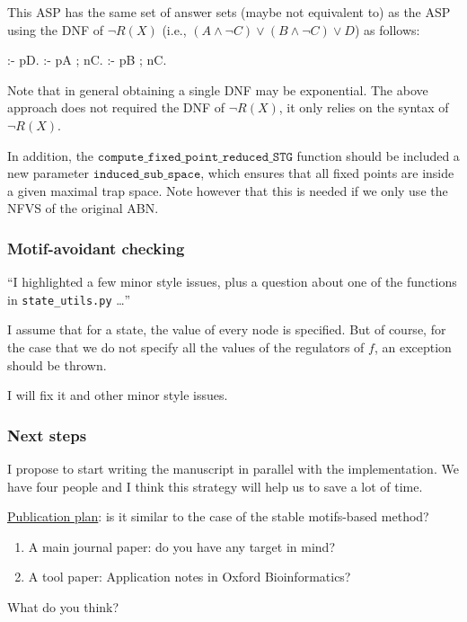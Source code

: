 \documentclass{beamer}              %
\begin{document}
\begin{frame}
This ASP has the same set of answer sets (maybe not equivalent to) as the ASP using the DNF of \(\neg R(X)\) (i.e., \((A \land \neg C) \lor (B \land \neg C) \lor D\)) as follows:

\begin{verbatim*}
:- pD.
:- pA ; nC.
:- pB ; nC.
\end{verbatim*}

Note that in general obtaining a single DNF may be exponential.
The above approach does not required the DNF of \(\neg R(X)\), it only relies on the syntax of \(\neg R(X)\).

\hspace{0cm}

In addition, the \(\texttt{compute\_fixed\_point\_reduced\_STG}\) function should be included a new parameter \(\texttt{induced\_sub\_space}\), which ensures that all fixed points are inside a given maximal trap space.
Note however that this is needed if we only use the NFVS of the original ABN.

\end{frame}

\begin{frame}
\frametitle{Motif-avoidant checking}

``I highlighted a few minor style issues, plus a question about one of the functions in \texttt{state\_utils.py} \dots''

\hspace{0cm}

I assume that for a state, the value of every node is specified.
But of course, for the case that we do not specify all the values of the regulators of \(f\), an exception should be thrown.

\hspace{0cm}

I will fix it and other minor style issues.

\end{frame}

\begin{frame}
\frametitle{Next steps}

I propose to start writing the manuscript in parallel with the
implementation. 
We have four people and I think this strategy will help us to save a lot of time.

\hspace{0cm}

\underline{Publication plan}: is it similar to the case of the stable motifs-based method?
\begin{enumerate}
  \item A main journal paper: do you have any target in mind?
  \item A tool paper: Application notes in Oxford Bioinformatics?
\end{enumerate}

\hspace{0cm}

What do you think?

\end{frame}
\end{document}
